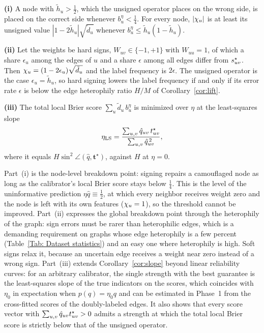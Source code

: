 \begin{corollary}\label{cor:breakdown}
\noindent\textbf{(i)} A node with $\tilde h_u>\tfrac12$, which the unsigned operator places on the wrong side, is placed on the correct side whenever $b^{\eta}_u<\tfrac14$. For every node, $|\chi_u|$ is at least its unsigned value $|1-2\tilde h_u|\sqrt{\tilde d_u}$ whenever $b^{\eta}_u\le\tilde h_u(1-\tilde h_u)$.

\smallskip\noindent\textbf{(ii)} Let the weights be hard signs, $W_{uv}\in\{-1,+1\}$ with $W_{uu}=1$, of which a share $\epsilon_u$ among the edges of $u$ and a share $\epsilon$ among all edges differ from $s^{\star}_{uv}$. Then $\chi_u=(1-2\epsilon_u)\sqrt{\tilde d_u}$ and the label frequency is $2\epsilon$. The unsigned operator is the case $\epsilon_u=\tilde h_u$, so hard signing lowers the label frequency if and only if its error rate $\epsilon$ is below the edge heterophily ratio $H/M$ of Corollary~\ref{cor:lift}.

\smallskip\noindent\textbf{(iii)} The total local Brier score $\sum_u\tilde d_u\,b^{\eta}_u$ is minimized over $\eta$ at the least-squares slope
\[
\eta_{\mathrm{LS}}=\frac{\sum_{u,v}\hat q_{uv}\,t^{\star}_{uv}}{\sum_{u,v}\hat q_{uv}^{\,2}},
\]
where it equals $H\sin^2\!\angle(\hat q,\bm t^\star)$, against $H$ at $\eta=0$.
\end{corollary}

Part~(i) is the node-level breakdown point: signing repairs a camouflaged node as long as the calibrator's local Brier score stays below $\tfrac14$. This is the level of the uninformative prediction $\eta\hat q\equiv\tfrac12$, at which every neighbor receives weight zero and the node is left with its own features ($\chi_u=1$), so the threshold cannot be improved.
Part~(ii) expresses the global breakdown point through the heterophily of the graph: sign errors must be rarer than heterophilic edges, which is a demanding requirement on graphs whose edge heterophily is a few percent (Table~\ref{Tab: Dataset statistics}) and an easy one where heterophily is high.
Soft signs relax it, because an uncertain edge receives a weight near zero instead of a wrong sign.
Part~(iii) extends Corollary~\ref{cor:slope} beyond linear reliability curves: for an arbitrary calibrator, the single strength with the best guarantee is the least-squares slope of the true indicators on the scores, which coincides with $\eta_0$ in expectation when $p(q)=\eta_0q$ and can be estimated in Phase~1 from the cross-fitted scores of the doubly-labeled edges.
It also shows that every score vector with $\sum_{u,v}\hat q_{uv}t^{\star}_{uv}>0$ admits a strength at which the total local Brier score is strictly below that of the unsigned operator.
